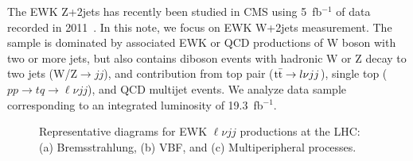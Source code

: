 The EWK Z+2jets has recently been studied in CMS using 5~fb${}^{-1}$ of data recorded in 2011~\cite{Chatrchyan:2013jya}. In this note, we focus on EWK W+2jets measurement. The sample is dominated by associated EWK or QCD productions of W boson 
with two or more jets, but also contains diboson events with hadronic
W or Z decay to two jets (W/Z$\to jj$), 
and contribution from top pair ($\mathrm{t}\bar{\mathrm{t}}\to l\nu jj$), single top ($pp\to tq \to \ell\nu jj$),
and QCD multijet events. We analyze data sample corresponding to an integrated 
luminosity of 19.3~fb${}^{-1}$.


\begin{figure}[h!]{
\centering
{}
\caption{\label{fig:wz_feynman} Representative diagrams for EWK $\ell\nu jj$ productions at the LHC: (a) Bremsstrahlung, (b) VBF, and (c) Multiperipheral processes.}}
\end{figure}

